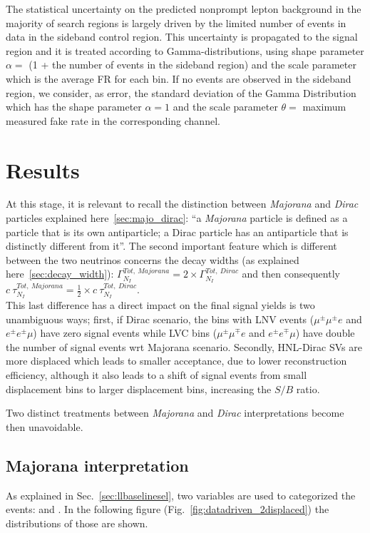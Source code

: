 The statistical uncertainty on the predicted nonprompt lepton background
in the majority of search regions is largely driven by the limited
number of events in data in the sideband control region. This uncertainty
is propagated to the signal region and it is treated according to Gamma-distributions, using shape parameter $\alpha =$ (1 +  the number of events in the sideband region) and the scale parameter which is the average FR for each bin.
If no events are observed in the sideband region, we consider, as error, the standard deviation of the Gamma Distribution which has the shape parameter $\alpha = 1$ and the scale parameter $\theta =$ maximum measured fake rate in the corresponding channel.  

\clearpage
\section{Results}
At this stage, it is relevant to recall the distinction between
\emph{Majorana} and \emph{Dirac} particles explained
here~\ref{sec:majo_dirac}: ``a \emph{Majorana} particle is defined as
a particle that is its own antiparticle; a Dirac particle has an
antiparticle that is distinctly different from it''.
The second important feature which is different between the two
neutrinos concerns the decay widths (as explained
here~\ref{sec:decay_width}): $\Gamma^{Tot, \: Majorana}_{N_{I}} = 2 \times \Gamma^{Tot, \: Dirac}_{N_{I}}
$ and then consequently $c\:\tau^{Tot, \: Majorana}_{N_{I}} = \frac{1}{2} \times c\:\tau^{Tot, \: Dirac}_{N_{I}}
$.\\
This last difference has a direct impact on the final signal yields is
two unambiguous ways; first, if Dirac scenario, the bins with LNV events ($\mu^{\pm}\mu^{\pm} e$ and $e^{\pm}e^{\pm}\mu$)
have zero signal events while LVC bins
($\mu^{\pm}\mu^{\mp} e$ and $e^{\pm}e^{\mp}\mu$) have double the
number of signal events wrt Majorana scenario. Secondly, HNL-Dirac SVs
are more displaced which leads to smaller acceptance, due to lower
reconstruction efficiency, although it also leads to a shift of signal
events from small displacement bins to larger displacement bins,
increasing the $S/B$ ratio.

Two distinct treatments between
\emph{Majorana} and \emph{Dirac} interpretations become then unavoidable. 

\subsection{Majorana interpretation}\label{subsec:majorana}
As explained in Sec.~\ref{sec:llbaselinesel}, two variables are used to categorized 
the events: \Deltwod and \mtwol. In the following figure (Fig.~\ref{fig:datadriven_2displaced}) the distributions of those are
shown.

